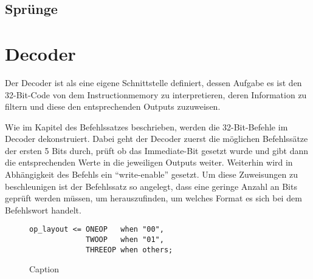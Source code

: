 \documentclass[paper=a4,fontsize=12pt,twocolumn]{scrreprt}
\begin{document}

\kant[7-8]

\subsection{Sprünge}


\kant[9]

\section{Decoder}


Der Decoder ist als eine eigene Schnittstelle definiert, dessen Aufgabe es ist den 32-Bit-Code von dem Instructionmemory zu interpretieren, deren Information zu filtern und diese den entsprechenden Outputs zuzuweisen.

Wie im Kapitel des Befehlssatzes beschrieben, werden die 32-Bit-Befehle im Decoder dekonstruiert.
Dabei geht der Decoder zuerst die möglichen Befehlssätze der ersten 5 Bits durch, prüft ob das Immediate-Bit gesetzt wurde und gibt dann die entsprechenden Werte in die jeweiligen Outputs weiter.
Weiterhin wird in Abhängigkeit des Befehls ein \enquote{write-enable} gesetzt.
Um diese Zuweisungen zu beschleunigen ist der Befehlssatz so angelegt, dass eine geringe Anzahl an Bits geprüft werden müssen, um herauszufinden, um welches Format es sich bei dem Befehlswort handelt.

\begin{figure}
    \centering
    \begin{lstlisting}
op_layout <= ONEOP   when "00",
             TWOOP   when "01",
             THREEOP when others;
    \end{lstlisting}
    \caption{Caption}
    \label{fig:my_label}
\end{figure}
\end{document}
